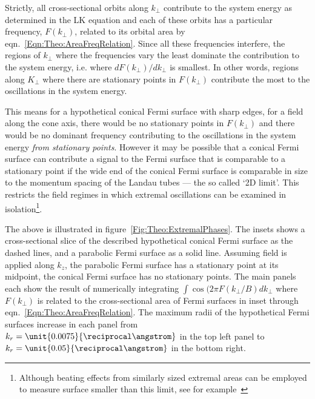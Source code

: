 Strictly, all cross-sectional orbits along $k_{\perp}$ contribute to the system energy as determined in the \ac{LK} equation and each of these orbits has a particular frequency, $F(k_{\perp})$, related to its orbital area by eqn.~\ref{Eqn:Theo:AreaFreqRelation}. Since all these frequencies interfere, the regions of $k_{\perp}$ where the frequencies vary the least dominate the contribution to the system energy, i.e. where $d F(k_{\perp})/dk_{\perp}$ is smallest. In other words, regions along $K_{\perp}$ where there are stationary points in $F(k_{\perp})$ contribute the most to the oscillations in the system energy.

This means for a hypothetical conical Fermi surface with sharp edges, for a field along the cone axis, there would be no stationary points in $F(k_{\perp})$ and there would be no dominant frequency contributing to the oscillations in the system energy \emph{from stationary points}. However it may be possible that a conical Fermi surface can contribute a signal to the Fermi surface that is comparable to a stationary point if the wide end of the conical Fermi surface is comparable in size to the momentum spacing of the Landau tubes --- the so called `2D limit'. This restricts the field regimes in which extremal oscillations can be examined in isolation\footnote{Although beating effects from similarly sized extremal areas can be employed to measure surface smaller than this limit, see for example~\cite{Carrington2005}}.

The above is illustrated in figure~\ref{Fig:Theo:ExtremalPhases}. The insets shows a cross-sectional slice of the described hypothetical conical Fermi surface as the dashed lines, and a parabolic Fermi surface as a solid line. Assuming field is applied along $k_z$, the parabolic Fermi surface has a stationary point at its midpoint, the conical Fermi surface has no stationary points. The main panels each show the result of numerically integrating $\int\cos{(2\pi F(k_{\perp}/B)} dk_{\perp}$ where $F(k_{\perp})$ is related to the cross-sectional area of Fermi surfaces in inset through eqn.~\ref{Eqn:Theo:AreaFreqRelation}. The maximum radii of the hypothetical Fermi surfaces increase in each panel from $k_r=\unit{0.0075}{\reciprocal\angstrom}$ in the top left panel to $k_r=\unit{0.05}{\reciprocal\angstrom}$ in the bottom right.

